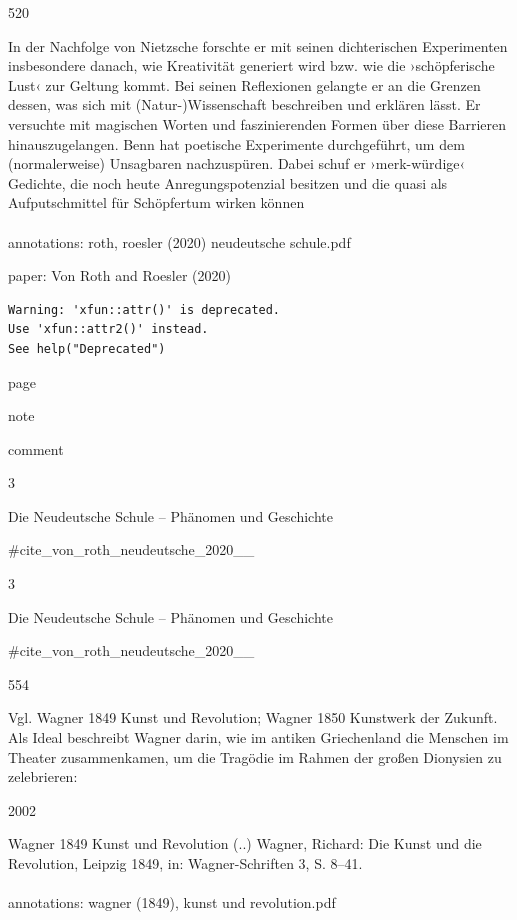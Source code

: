 \documentclass[
  letterpaper,
  DIV=11,
  numbers=noendperiod]{scrartcl}
\makeatletter
\let\oldparagraph\paragraph
\renewcommand{\paragraph}{
    \@ifstar
      \xxxParagraphStar
      \xxxParagraphNoStar
  }
\newcommand{\xxxParagraphStar}[1]{\oldparagraph*{#1}\mbox{}}
\newcommand{\xxxParagraphNoStar}[1]{\oldparagraph{#1}\mbox{}}
\makeatother
\begin{document}
520

In der Nachfolge von Nietzsche forschte er mit seinen dichterischen
Experimenten insbesondere danach, wie Kreativität generiert wird bzw.
wie die ›schöpferische Lust‹ zur Geltung kommt. Bei seinen Reflexionen
gelangte er an die Grenzen dessen, was sich mit (Natur-)Wissenschaft
beschreiben und erklären lässt. Er versuchte mit magischen Worten und
faszinierenden Formen über diese Barrieren hinauszugelangen. Benn hat
poetische Experimente durchgeführt, um dem (normalerweise) Unsagbaren
nachzuspüren. Dabei schuf er ›merk-würdige‹ Gedichte, die noch heute
Anregungspotenzial besitzen und die quasi als Aufputschmittel für
Schöpfertum wirken können

\paragraph{annotations: roth, roesler (2020) neudeutsche
schule.pdf}\label{annotations-roth-roesler-2020-neudeutsche-schule.pdf}

paper: Von Roth and Roesler (2020)

\begin{verbatim}
Warning: 'xfun::attr()' is deprecated.
Use 'xfun::attr2()' instead.
See help("Deprecated")
\end{verbatim}

page

note

comment

3

Die Neudeutsche Schule -- Phänomen und Geschichte

\#cite\_von\_roth\_neudeutsche\_2020\_\_

3

Die Neudeutsche Schule -- Phänomen und Geschichte

\#cite\_von\_roth\_neudeutsche\_2020\_\_

554

Vgl. Wagner 1849 Kunst und Revolution; Wagner 1850 Kunstwerk der
Zukunft. Als Ideal beschreibt Wagner darin, wie im antiken Griechenland
die Menschen im Theater zusammenkamen, um die Tragödie im Rahmen der
großen Dionysien zu zelebrieren:

2002

Wagner 1849 Kunst und Revolution (..) Wagner, Richard: Die Kunst und die
Revolution, Leipzig 1849, in: Wagner-Schriften 3, S. 8--41.

\paragraph{annotations: wagner (1849), kunst und
revolution.pdf}\label{annotations-wagner-1849-kunst-und-revolution.pdf}
\end{document}
